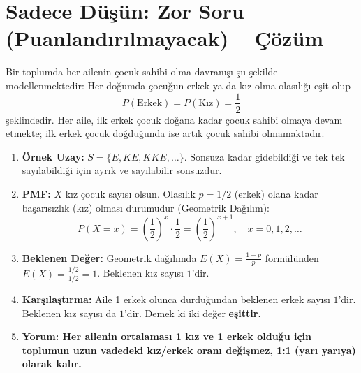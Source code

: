 \documentclass[12pt,a4paper]{article}
\begin{document}
\vspace{1cm}
\section*{\textbf{\color{TitleColor}Sadece Düşün: Zor Soru (Puanlandırılmayacak) -- Çözüm}}

Bir toplumda her ailenin çocuk sahibi olma davranışı şu şekilde modellenmektedir: Her doğumda çocuğun erkek ya da kız olma olasılığı eşit olup
\[
P(\text{Erkek}) = P(\text{Kız}) = \frac{1}{2}
\]
şeklindedir. Her aile, ilk erkek çocuk doğana kadar çocuk sahibi olmaya devam etmekte; ilk erkek çocuk doğduğunda ise artık çocuk sahibi olmamaktadır.

\begin{enumerate}
    \item[\textbf{a)}] \textbf{Örnek Uzay:} $S = \{E, KE, KKE, \dots\}$. Sonsuza kadar gidebildiği ve tek tek sayılabildiği için ayrık ve sayılabilir sonsuzdur.
    
    \item[\textbf{b)}] \textbf{PMF:} $X$ kız çocuk sayısı olsun. Olasılık $p=1/2$ (erkek) olana kadar başarısızlık (kız) olması durumudur (Geometrik Dağılım):
    \[
    P(X=x) = \left(\frac{1}{2}\right)^x \cdot \frac{1}{2} = \left(\frac{1}{2}\right)^{x+1}, \quad x=0, 1, 2, \dots
    \]
    
    \item[\textbf{c)}] \textbf{Beklenen Değer:} Geometrik dağılımda $E(X) = \frac{1-p}{p}$ formülünden $E(X) = \frac{1/2}{1/2} = 1$. Beklenen kız sayısı $1$'dir.
    
    \item[\textbf{d)}] \textbf{Karşılaştırma:} Aile 1 erkek olunca durduğundan beklenen erkek sayısı $1$'dir. Beklenen kız sayısı da $1$'dir. Demek ki iki değer \textbf{eşittir}.
    
    \item[\textbf{\color{ChoiceColor}e)}] \textcolor{ChoiceColor}{\textbf{Yorum: Her ailenin ortalaması 1 kız ve 1 erkek olduğu için toplumun uzun vadedeki kız/erkek oranı değişmez, 1:1 (yarı yarıya) olarak kalır.}}
\end{enumerate}
\end{document}
